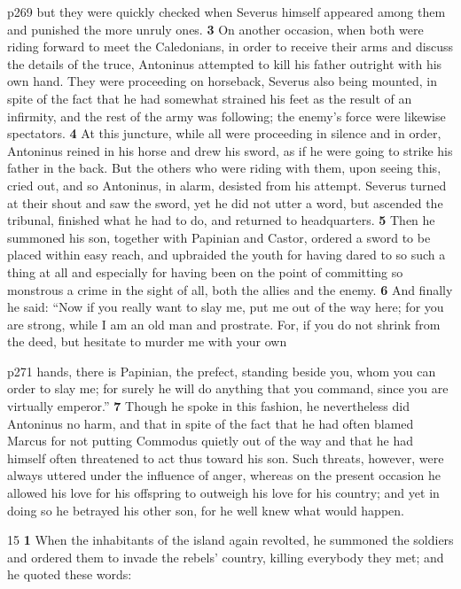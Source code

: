 p269 but they were quickly checked when Severus himself appeared among them and punished the more unruly ones. \textbf{3} On another occasion, when both were riding forward to meet the Caledonians, in order to receive their arms and discuss the details of the truce, Antoninus attempted to kill his father outright with his own hand. They were proceeding on horseback, Severus also being mounted, in spite of the fact that he had somewhat strained his feet as the result of an infirmity, and the rest of the army was following; the enemy's force were likewise spectators. \textbf{4} At this juncture, while all were proceeding in silence and in order, Antoninus reined in his horse and drew his sword, as if he were going to strike his father in the back. But the others who were riding with them, upon seeing this, cried out, and so Antoninus, in alarm, desisted from his attempt. Severus turned at their shout and saw the sword, yet he did not utter a word, but ascended the tribunal, finished what he had to do, and returned to headquarters. \textbf{5} Then he summoned his son, together with Papinian and Castor, ordered a sword to be placed within easy reach, and upbraided the youth for having dared to so such a thing at all and especially for having been on the point of committing so monstrous a crime in the sight of all, both the allies and the enemy. \textbf{6} And finally he said: ``Now if you really want to slay me, put me out of the way here; for you are strong, while I am an old man and prostrate. For, if you do not shrink from the deed, but hesitate to murder me with your own

p271 hands, there is Papinian, the prefect, standing beside you, whom you can order to slay me; for surely he will do anything that you command, since you are virtually emperor.'' \textbf{7} Though he spoke in this fashion, he nevertheless did Antoninus no harm, and that in spite of the fact that he had often blamed Marcus for not putting Commodus quietly out of the way and that he had himself often threatened to act thus toward his son. Such threats, however, were always uttered under the influence of anger, whereas on the present occasion he allowed his love for his offspring to outweigh his love for his country; and yet in doing so he betrayed his other son, for he well knew what would happen.

15
\textbf{1} When the inhabitants of the island again revolted, he summoned the soldiers and ordered them to invade the rebels' country, killing everybody they met; and he quoted these words:

